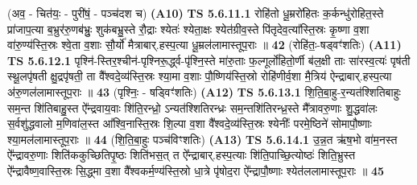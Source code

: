 \documentclass[17pt]{extarticle}
\begin{document}
                  \newline
                      (अव॒ - चित॑यः॒ - पुरी॑षं॒ - पञ्च॑दश च)  \textbf{(A10)} \newline \newline
                                        \textbf{ TS 5.6.11.1} \newline
                  रोहि॑तो धू॒म्ररो॑हितः क॒र्कन्धु॑रोहित॒स्ते प्रा॑जाप॒त्या ब॒भ्रुर॑रु॒णब॑भ्रुः॒ शुक॑बभ्रु॒स्ते रौ॒द्राः श्येतः॑ श्येता॒क्षः श्येत॑ग्रीव॒स्ते पि॑तृदेव॒त्या᳚स्ति॒स्रः कृ॒ष्णा व॒शा वा॑रु॒ण्य॑स्ति॒स्रः श्वे॒ता व॒शाः सौ॒र्यो॑ मैत्राबार्.हस्प॒त्या धू॒म्रल॑लामास्तूप॒राः ॥ \textbf{  42 } \newline
                  \newline
                      (रोहि॑तः॒-षड्वꣳ॑शतिः)  \textbf{(A11)} \newline \newline
                                        \textbf{ TS 5.6.12.1} \newline
                  पृश्नि॑-स्तिर॒श्चीन॑-पृश्निरू॒र्द्ध्व-पृ॑श्नि॒स्ते मा॑रु॒ताः फ॒ल्गूर्लो॑हितो॒र्णी ब॑ल॒क्षी ताः सा॑रस्व॒त्यः॑ पृष॑ती स्थू॒लपृ॑षती क्षु॒द्रपृ॑षती॒ ता वै᳚श्वदे॒व्य॑स्ति॒स्रः श्या॒मा व॒शाः पौ॒ष्णिय॑स्ति॒स्रो रोहि॑णीर्व॒शा मै॒त्रिय॑ ऐन्द्राबार्.हस्प॒त्या अ॑रु॒णल॑लामास्तूप॒राः ॥ \textbf{  43 } \newline
                  \newline
                      (पृश्निः॒ - षड्विꣳ॑शतिः)  \textbf{(A12)} \newline \newline
                                        \textbf{ TS 5.6.13.1} \newline
                  शि॒ति॒बा॒हु-र॒न्यत॑श्शितिबाहुः सम॒न्त शि॑तिबाहु॒स्त ऐ᳚न्द्रवाय॒वाः शि॑ति॒रन्ध्रो॒ ऽन्यत॑श्शितिरन्ध्रः सम॒न्तशि॑तिरन्ध्र॒स्ते मै᳚त्रावरु॒णाः शु॒द्धवा॑लः स॒र्वशु॑द्धवालो म॒णिवा॑ल॒स्त आ᳚श्वि॒नास्ति॒स्रः शि॒ल्पा व॒शा वै᳚श्वदे॒व्य॑स्ति॒स्रः श्येनीः᳚ परमे॒ष्ठिने॑ सोमापौ॒ष्णाः श्या॒मल॑लामास्तूप॒राः ॥ \textbf{  44 } \newline
                  \newline
                      (शि॒ति॒बा॒हुः पञ्च॑विꣳशतिः)  \textbf{(A13)} \newline \newline
                                        \textbf{ TS 5.6.14.1} \newline
                  उ॒न्न॒त ऋ॑ष॒भो वा॑म॒नस्त ऐ᳚न्द्रावरु॒णाः शिति॑ककुच्छितिपृ॒ष्ठः शिति॑भस॒त् त ऐ᳚न्द्राबार्.हस्प॒त्याः शि॑ति॒पाच्छि॒त्योष्ठः॑ शिति॒भ्रुस्त ऐ᳚न्द्रावैष्ण॒वास्ति॒स्रः सि॒द्ध्मा व॒शा वै᳚श्वकर्म॒ण्य॑स्ति॒स्रो धा॒त्रे पृ॑षोद॒रा ऐ᳚न्द्रापौ॒ष्णाः श्येत॑ललामास्तूप॒राः ॥ \textbf{  45 } \newline
\end{document}
